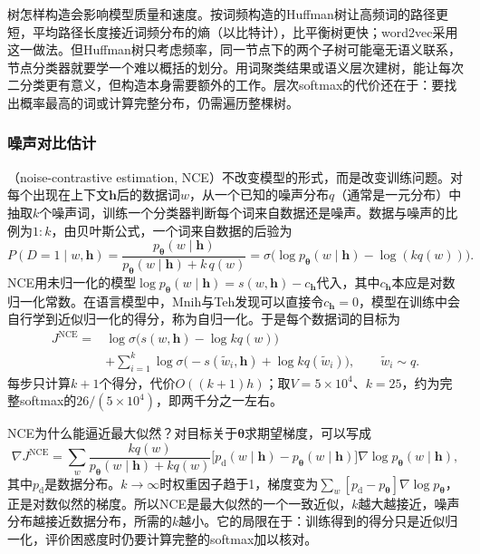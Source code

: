 树怎样构造会影响模型质量和速度。按词频构造的Huffman树让高频词的路径更短，平均路径长度接近词频分布的熵（以比特计），比平衡树更快；word2vec采用这一做法。但Huffman树只考虑频率，同一节点下的两个子树可能毫无语义联系，节点分类器就要学一个难以概括的划分。用词聚类结果或语义层次建树，能让每次二分类更有意义，但构造本身需要额外的工作。层次softmax的代价还在于：要找出概率最高的词或计算完整分布，仍需遍历整棵树。

\subsubsection{噪声对比估计}
\label{sec:nlp-classical-nce}

（noise-contrastive estimation, NCE）不改变模型的形式，而是改变训练问题。对每个出现在上下文$\bm h$后的数据词$w$，从一个已知的噪声分布$q$（通常是一元分布）中抽取$k$个噪声词，训练一个分类器判断每个词来自数据还是噪声。数据与噪声的比例为$1:k$，由贝叶斯公式，一个词来自数据的后验为
\[
  P(D=1\mid w,\bm h)=\frac{p_{\bm\theta}(w\mid\bm h)}{p_{\bm\theta}(w\mid\bm h)+k\,q(w)}=\sigma\bigl(\log p_{\bm\theta}(w\mid\bm h)-\log(kq(w))\bigr).
\]
NCE用未归一化的模型$\log p_{\bm\theta}(w\mid\bm h)=s(w,\bm h)-c_{\bm h}$代入，其中$c_{\bm h}$本应是对数归一化常数。在语言模型中，Mnih与Teh发现可以直接令$c_{\bm h}=0$，模型在训练中会自行学到近似归一化的得分，称为自归一化。于是每个数据词的目标为
\begin{equation}
  \begin{aligned}
    J^{\mathrm{NCE}}={}&\log\sigma\bigl(s(w,\bm h)-\log kq(w)\bigr)\\
    &+\sum_{i=1}^{k}\log\sigma\bigl(-s(\tilde w_i,\bm h)+\log kq(\tilde w_i)\bigr),\qquad \tilde w_i\sim q.
  \end{aligned}
  \label{eq:nlp-classical-nce}
\end{equation}
每步只计算$k+1$个得分，代价$O((k+1)h)$；取$V=5\times10^4$、$k=25$，约为完整softmax的$26/(5\times10^4)$，即两千分之一左右。

NCE为什么能逼近最大似然？对目标关于$\bm\theta$求期望梯度，可以写成
\[
  \nabla J^{\mathrm{NCE}}=\sum_{w}\frac{kq(w)}{p_{\bm\theta}(w\mid\bm h)+kq(w)}\bigl[p_{\mathrm{d}}(w\mid\bm h)-p_{\bm\theta}(w\mid\bm h)\bigr]\nabla\log p_{\bm\theta}(w\mid\bm h),
\]
其中$p_{\mathrm d}$是数据分布。$k\to\infty$时权重因子趋于1，梯度变为$\sum_w[p_{\mathrm d}-p_{\bm\theta}]\nabla\log p_{\bm\theta}$，正是对数似然的梯度。所以NCE是最大似然的一个一致近似，$k$越大越接近，噪声分布越接近数据分布，所需的$k$越小。它的局限在于：训练得到的得分只是近似归一化，评价困惑度时仍要计算完整的softmax加以核对。

